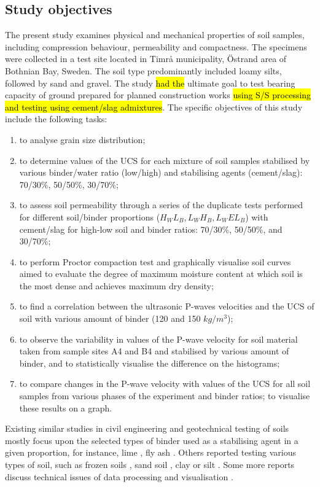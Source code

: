 \documentclass{amestyle}
\begin{document}
\newpage
\subsection{Study objectives} 
The present study examines physical and mechanical properties of soil samples, including compression behaviour, permeability and compactness. The specimens were collected in a test site located in Timrå municipality, Östrand area of Bothnian Bay, Sweden. The soil type predominantly included loamy silts, followed by sand and gravel. The study \hl{had the} ultimate goal to test bearing capacity of ground prepared for planned construction works \hl{using S/S processing and testing using cement/slag admixtures}. The specific objectives of this study include the following tasks: 

\begin{enumerate}
   \item to analyse grain size distribution;
   \item to determine values of the UCS for each mixture of soil samples stabilised by various binder/water ratio (low/high) and stabilising agents (cement/slag): 70/30\%, 50/50\%, 30/70\%; 
  \item to assess soil permeability through a series of the duplicate tests performed for different soil/binder proportions ($H_WL_B,L_WH_B,L_WEL_B$) with cement/slag for high-low soil and binder ratios: 70/30\%, 50/50\%, and 30/70\%;
  \item to perform Proctor compaction test and graphically visualise soil curves aimed to evaluate the degree of maximum moisture content at which soil is the most dense and achieves maximum dry density;
  \item to find a correlation between the ultrasonic P-waves velocities and the UCS of soil with various amount of binder (120 and 150 $kg/m^3$);
  \item to observe the variability in values of the P-wave velocity for soil material taken from sample sites A4 and B4 and stabilised by various amount of binder, and to statistically visualise the difference on the histograms;
  \item to compare changes in the P-wave velocity with values of the UCS for all soil samples from various phases of the experiment and binder ratios; to visualise these results on a graph.
\end{enumerate}

Existing similar studies in civil engineering and geotechnical testing of soils mostly focus upon the selected types of binder used as a stabilising agent in a given proportion, for instance, lime \cite{Rao,Mukhtar,Swaidani}, fly ash \cite{Phetchuay}. Others reported testing various types of soil, such as frozen soils \cite{Lemenkov2021b,Lemenkov2021c}, sand soil \cite{Robertson}, clay or silt \cite{Komal}. Some more reports discuss technical issues of data processing and visualisation \cite{Kaellenetal2014,Lemenkov2021c}. 
\end{document}
